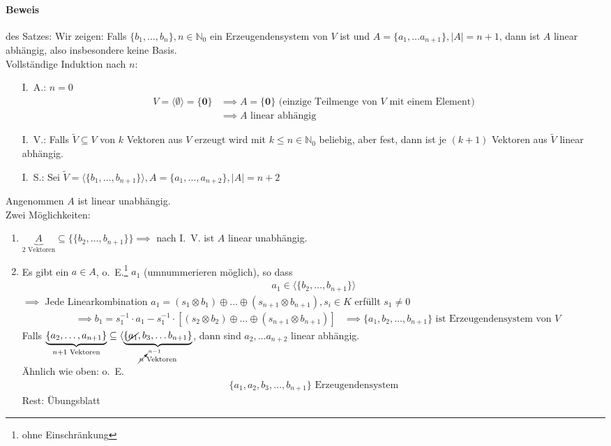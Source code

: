 \documentclass[a5paper, 10pt]{book}
\newcommand{\inN}{\in\mathbb{N}}
\newcommand{\lincombine}[4]{(#1_{#3} \circlecdot #2_{#3}) \circleplus \dots \circleplus (#1_{#4} \circlecdot #2_{#4})}%
\newcommand{\circleplus}{\oplus}%
\newcommand{\circlecdot}{\otimes}%
\newcommand{\boldzero}{\mathbf{0}}
\begin{document}
			\paragraph{Beweis} des Satzes: Wir zeigen: Falls $\{b_1,\dots,b_n\}, n \inN_0$ ein Erzeugendensystem von $V$ ist und $A = \{ a_1, \dots a_{n+1}\}, |A| = n+1$, dann ist $A$ linear abhängig, also insbesondere keine Basis.\\
			Vollständige Induktion nach $n$:
			\pagebreak[3]
			\begin{itemize}\nopagebreak[4]
				\item[I.~A.:] \nopagebreak[4]$n=0$\nopagebreak[4]\\ \nopagebreak[4]
					\nopagebreak[4]\begin{align}
						V = \langle \emptyset \rangle = \{\boldzero\} & \implies A = \{\boldzero\} \text{ (einzige Teilmenge von } V \text{ mit einem Element)}\\
						& \implies A \text{ linear abhängig}
					\end{align}
				\item[I.~V.:] Falls $\tilde{V} \subseteq V$ von $k$ Vektoren aus $V$ erzeugt wird mit $k \leq n \inN_0$ beliebig, aber fest, dann ist je $(k+1)$ Vektoren aus $\tilde{V}$ linear abhängig.
				\item[I.~S.:] Sei $\tilde{V} = \langle \{ b_1, \dots, b_{n+1} \} \rangle, A = \{ a_1, \dots, a_{n+2} \}, |A| = n+2$
			\end{itemize}
		Angenommen $A$ ist linear unabhängig.\\
		Zwei Möglichkeiten:
		\begin{enumerate}
			\item $\underbrace{A}_\text{2 Vektoren} \subseteq \lbrace \{ b_2, \dots, b_{n+1} \} \rbrace \implies$ nach I.~V. ist $A$ linear unabhängig. \lightning
			\item Es gibt ein $a \in A$, o.~E.\footnote{ohne Einschränkung} $a_1$ (umnummerieren möglich), so dass
			\begin{align}
				a_1 \in \langle \{b_2, \dots, b_{n+1}\} \rangle
			\end{align}
			$\implies$ Jede Linearkombination $a_1 =  \lincombine{s}{b}{1}{n+1}, s_i \in K$ erfüllt $s_1 \neq 0$
			\begin{align}
				&\implies b_1 = s_1^{-1} \cdot a_1 - s_1^{-1} \cdot [\lincombine{s}{b}{2}{n+1}]
				&\implies \{a_1, b_2, \dots, b_{n+1}\} \text{ ist Erzeugendensystem von } V
			\end{align}
			Falls $\underbrace{\{a_2, \dots, a_{n+1}\}}_{n+1\text{ Vektoren}} \subseteq \langle \underbrace{\{\cancel{a_1}, b_3, \dots b_{n+1}\}}_{\cancelto{n-1}{n} \text{ Vektoren}}$, dann sind $a_2, \dots a_{n+2}$ linear abhängig. \lightning\\
			Ähnlich wie oben: o.~E.
			\begin{align}
				\{a_1, a_2, b_3, \dots, b_{n+1}\} \text{ Erzeugendensystem}
			\end{align}
			Rest: Übungsblatt
		\end{enumerate}
		
		
		
		
		
			
	\printindex
\end{document}
